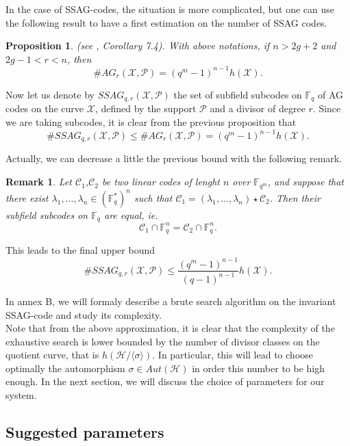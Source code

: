 \documentclass[10pt]{article}
\newtheorem{prop1}[thm]{Proposition}
\newtheorem{rq1}[thm]{Remark}
\newcommand{\s}{\vspace{0.3cm}}
\newcommand{\C}{\mathcal{C}}
\newcommand{\fqm}{\mathbb{F}_{q^m}}
\newcommand{\fq}{\mathbb{F}_q}
\newcommand{\X}{\mathcal{X}}
\newcommand{\PR}{\mathcal{P}}
\begin{document}
\s

In the case of SSAG-codes, the situation is more complicated, but one can use the following result to have a first estimation on the number of SSAG codes.

\s

\begin{prop1} \rm (see \cite{CMRP}, Corollary 7.4). \it 
With above notations, if $n>2g+2$ and $2g-1<r<n$, then 
\[\#AG_r(\X,\PR) = (q^m-1)^{n-1}h(\X).\]
\end{prop1}

Now let us denote by $SSAG_{q,r}(\X,\PR)$ the set of subfield subcodes on $\fq$ of AG codes on the curve $\X$, defined by the support $\PR$ and a divisor of degree $r$. Since we are taking subcodes, it is clear from the previous proposition that 
\[\#SSAG_{q,r}(\X,\PR) \leq \#AG_r(\X,\PR) = (q^m-1)^{n-1}h(\X).\]

Actually, we can decrease a little the previous bound with the following remark.

\s

\begin{rq1} \rm
Let $\C_1$,$\C_2$ be two linear codes of lenght $n$ over $\fqm$, and suppose that there exist $\lambda_1,...,\lambda_n \in (\fq^*)^n$ such that $\C_1 = (\lambda_1,...,\lambda_n) \star \C_2$. Then their subfield subcodes on $\fq$ are equal, ie.
\[\C_1 \cap \fq^n = \C_2 \cap \fq^n.\]
\end{rq1}

\s

This leads to the final upper bound 
\begin{equation} \label{nb of sssag}
 \#SSAG_{q,r}(\X,\PR) \leq \dfrac{(q^m-1)^{n-1}}{(q-1)^{n-1}}h(\X).
\end{equation} 

\s

In annex B, we will formaly describe a brute search algorithm on the invariant SSAG-code and study its complexity. \\
Note that from the above approximation, it is clear that the complexity of the exhaustive search is lower bounded by the number of divisor classes on the quotient curve, that is $h(\mathcal{H}/\langle \sigma \rangle)$. In particular, this will lead to choose optimally the automorphism $\sigma \in Aut(\mathcal{H})$ in order this number to be high enough. In the next section, we will discuss the choice of parameters for our system.

\s

\subsection{Suggested parameters}
\end{document}
